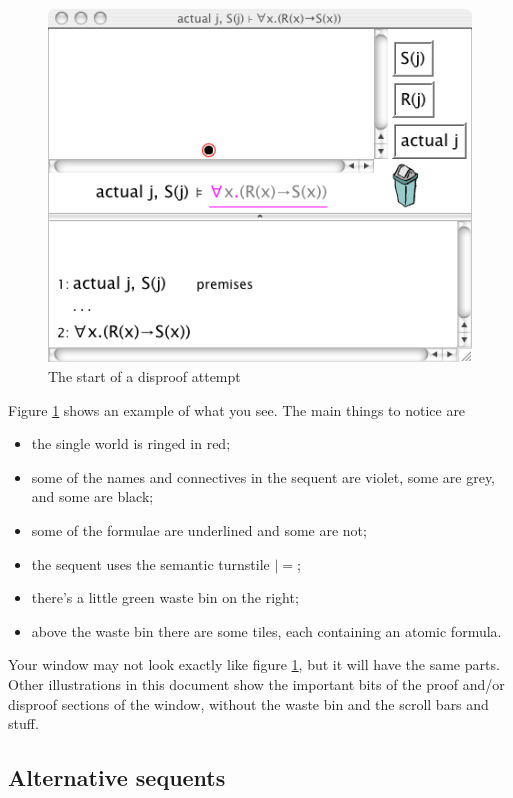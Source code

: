 \documentclass[11pt]{article}
\begin{document}
\begin{figure}
\begin{center}
\includegraphics[scale=0.6]{pics/firstexample.png}
\caption{The start of a disproof attempt}
\label{fig:firstexample}
\end{center}
\end{figure}
Figure \ref{fig:firstexample} shows an example of what you see. The main things to notice are
\begin{itemize}
\item the single world is ringed in red;
\item some of the names and connectives in the sequent are violet, some are grey, and some are black;
\item some of the formulae are underlined and some are not;
\item the sequent uses the semantic turnstile $|=$; 
\item there's a little green waste bin on the right;
\item above the waste bin there are some tiles, each containing an atomic formula.
\end{itemize}
Your window may not look exactly like figure \ref{fig:firstexample}, but it will have the same parts. Other illustrations in this document show the important bits of the proof and/or disproof sections of the window, without the waste bin and the scroll bars and stuff.

\subsection{Alternative sequents}
\end{document}

